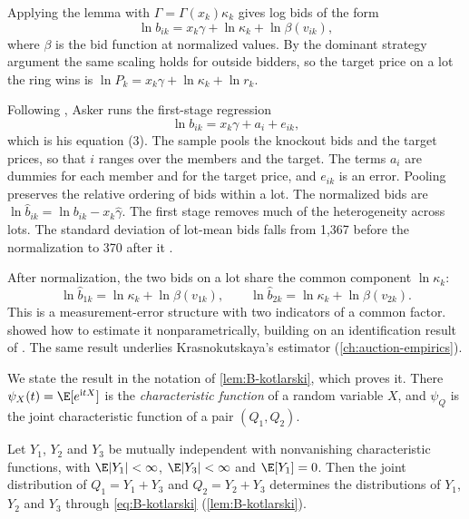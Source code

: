 Applying the lemma with $\Gamma=\Gamma(x_k)\kappa_k$ gives
log bids of the form
\begin{equation}\label{eq:13-asker-logbid}
\ln b_{ik}=x_k\gamma+\ln\kappa_k+\ln\beta(v_{ik}),
\end{equation}
where $\beta$ is the bid function at normalized values. By the dominant strategy argument the same scaling holds
for outside bidders, so the target price on a lot the ring wins is $\ln P_k=x_k\gamma+\ln\kappa_k+\ln r_k$.

Following \citet{HaileHongShum2003}, Asker runs the first-stage regression
\begin{equation}\label{eq:13-asker-firststage}
\ln b_{ik}=x_k\gamma+a_i+e_{ik},
\end{equation}
which is his equation (3). The sample pools the knockout bids and the target prices, so that $i$ ranges over the
members and the target. The terms $a_i$ are dummies for each member and for the target price, and $e_{ik}$ is an
error. Pooling preserves the relative ordering of bids within a lot. The normalized bids are
$\ln\hat b_{ik}=\ln b_{ik}-x_k\hat\gamma$. The first stage removes much of the heterogeneity across lots. The
standard deviation of lot-mean bids falls from 1,367 before the normalization to 370 after it
\citep[footnote 45]{Asker2010}.

After normalization, the two bids on a lot share the common component $\ln\kappa_k$:
\begin{equation}\label{eq:13-asker-pairs}
\ln\hat b_{1k}=\ln\kappa_k+\ln\beta(v_{1k}),\qquad\ln\hat b_{2k}=\ln\kappa_k+\ln\beta(v_{2k}).
\end{equation}
This is a measurement-error structure with two indicators of a common factor. \citet{LiVuong1998} showed how to
estimate it nonparametrically, building on an identification result of \citet{Kotlarski1966}. The same result
underlies Krasnokutskaya's estimator (\cref{ch:auction-empirics}).

We state the result in the notation of \cref{lem:B-kotlarski}, which proves it. There $\psi_X(t)=\E[e^{\mathrm{i}tX}]$
is the \emph{characteristic function} of a random variable $X$, and $\psi_Q$ is the joint characteristic function of a
pair $(Q_1,Q_2)$.

\begin{theorem}[Kotlarski 1966]\label{thm:13-kotlarski}
Let $Y_1$, $Y_2$ and $Y_3$ be mutually independent with nonvanishing characteristic functions, with
$\E|Y_1|<\infty$, $\E|Y_3|<\infty$ and $\E[Y_1]=0$. Then the joint distribution of $Q_1=Y_1+Y_3$ and
$Q_2=Y_2+Y_3$ determines the distributions of $Y_1$, $Y_2$ and $Y_3$ through \eqref{eq:B-kotlarski}
(\cref{lem:B-kotlarski}).
\end{theorem}


